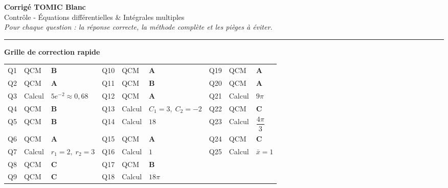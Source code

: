 \documentclass[11pt,a4paper]{article}
\begin{document}
\begin{center}
  {\Large\bfseries\color{bleutexte} Corrigé TOMIC Blanc}\\[4pt]
  {\large Contrôle - Équations différentielles \& Intégrales multiples}\\[6pt]
  {\small\itshape
    Pour chaque question : la réponse correcte, la méthode complète et les pièges à éviter.}
\end{center}

\vspace{2pt}
\noindent\rule{\linewidth}{0.6pt}
\vspace{4pt}

\begin{notebox}
\textbf{Grille de correction rapide}\\[4pt]
\begin{tabular}{@{}lll@{\quad}lll@{\quad}lll@{}}
Q1  & QCM    & \textbf{B}              &
Q10 & QCM    & \textbf{A}              &
Q19 & QCM    & \textbf{A}              \\
Q2  & QCM    & \textbf{A}              &
Q11 & QCM    & \textbf{B}              &
Q20 & QCM    & \textbf{A}              \\
Q3  & Calcul & $5e^{-2}\approx 0{,}68$ &
Q12 & QCM    & \textbf{A}              &
Q21 & Calcul & $9\pi$                  \\
Q4  & QCM    & \textbf{B}              &
Q13 & Calcul & $C_1=3,\;C_2=-2$        &
Q22 & QCM    & \textbf{C}              \\
Q5  & QCM    & \textbf{B}              &
Q14 & Calcul & $18$                    &
Q23 & Calcul & $\dfrac{4\pi}{3}$       \\
Q6  & QCM    & \textbf{A}              &
Q15 & QCM    & \textbf{A}              &
Q24 & QCM    & \textbf{C}              \\
Q7  & Calcul & $r_1=2,\;r_2=3$         &
Q16 & Calcul & $1$                     &
Q25 & Calcul & $\bar{x}=1$             \\
Q8  & QCM    & \textbf{C}              &
Q17 & QCM    & \textbf{B}              \\
Q9  & QCM    & \textbf{C}              &
Q18 & Calcul & $18\pi$                 \\
\end{tabular}
\end{notebox}

\end{document}
